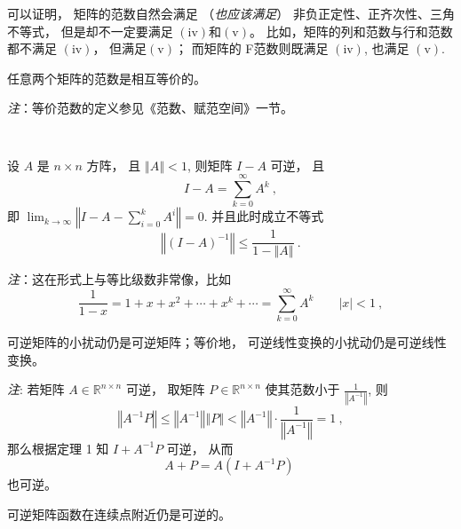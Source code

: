  可以证明， 矩阵的范数自然会满足 （\textsl{也应该满足}） 非负正定性、正齐次性、三角不等式， 但是却不一定要满足 $(\mathrm{iv})$和$(\mathrm{v})$。 比如，矩阵的列和范数与行和范数都不满足 $(\mathrm{iv})$， 但满足$(\mathrm{v})$； 而矩阵的 F范数则既满足 $(\mathrm{iv})$, 也满足 $(\mathrm{v})$. 



\begin{theorem}{}
任意两个矩阵的范数是相互等价的。 

\textsl{注}：等价范数的定义参见《范数、赋范空间》一节。
\end{theorem}
\verb| |

\begin{theorem}{}
设 $A$ 是 $n\times n$ 方阵， 且 $\left\Vert A\right\Vert <1$, 则矩阵 $I-A$
可逆， 且 
\[
I-A=\sum_{k=0}^{\infty}A^{k}~,
\]
即 ${\displaystyle \lim_{k\rightarrow\infty}}\left\Vert I-A-{\displaystyle \sum_{i=0}^{k}A^{i}}\right\Vert =0.$
并且此时成立不等式
\[
\left\Vert (I-A)^{-1}\right\Vert \leqslant{\displaystyle \frac{1}{1-\left\Vert A\right\Vert }~.}
\]
\end{theorem}
\textsl{注}：这在形式上与等比级数非常像，比如
\[
{\displaystyle \frac{1}{1-x}=1+x+x^{2}+\cdots+x^{k}+\cdots=\sum_{k=0}^{\infty}A^{k}\quad\quad|x|<1}~,\]


\begin{corollary}{}
可逆矩阵的小扰动仍是可逆矩阵；等价地， 可逆线性变换的小扰动仍是可逆线性变换。
\end{corollary}

\textsl{注}: 若矩阵 $A\in\mathbb{R}^{n\times n}$ 可逆， 取矩阵 $P\in\mathbb{R}^{n\times n}$
使其范数小于 $\frac{1}{\left\Vert A^{-1}\right\Vert }$, 则
\[
\left\Vert A^{-1}P\right\Vert \leqslant\left\Vert A^{-1}\right\Vert \left\Vert P\right\Vert <\left\Vert A^{-1}\right\Vert \cdot{\displaystyle \frac{1}{\left\Vert A^{-1}\right\Vert }=1~,}
\]
那么根据定理 1 知 $I+A^{-1}P$ 可逆， 从而
\[
A+P=A(I+A^{-1}P)~
\]
也可逆。 

\begin{corollary}{}
可逆矩阵函数在连续点附近仍是可逆的。
\end{corollary} 
